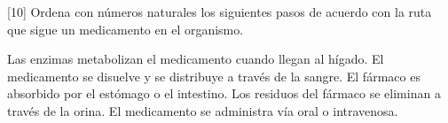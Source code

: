 [10] Ordena con n\'umeros naturales los siguientes pasos de acuerdo con la ruta que sigue un medicamento en el organismo.
\begin{choices}
    \choice\fillin[4] Las enzimas metabolizan el medicamento cuando llegan al hígado.
    \choice\fillin[3] El medicamento se disuelve y se distribuye a través de la sangre.
    \choice\fillin[2] El fármaco es absorbido por el estómago o el intestino.
    \choice\fillin[5] Los residuos del fármaco se eliminan a través de la orina.
    \choice\fillin[1] El medicamento se administra vía oral o intravenosa.
\end{choices}